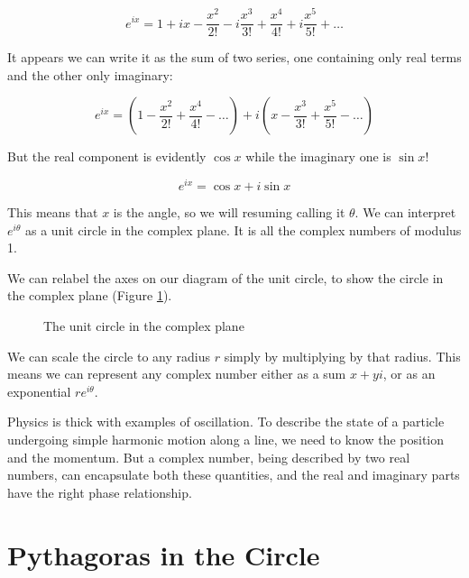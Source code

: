 $$
e^{ix} = 1 + ix - \frac{x^2}{2!} - i\frac{x^3}{3!} + \frac{x^4}{4!} + i\frac{x^5}{5!} + \ldots
$$

It appears we can write it as the sum of two series, one containing only real terms and the other only imaginary:

$$
e^{ix} = (1 - \frac{x^2}{2!} + \frac{x^4}{4!} - \ldots) + i(x - \frac{x^3}{3!} + \frac{x^5}{5!} - \ldots)
$$

But the real component is evidently $\cos x$ while the imaginary one is $\sin x$!

$$
e^{ix} = \cos x + i\sin x
$$

This means that $x$ is the angle, so we will resuming calling it $\theta$. We can interpret $e^{i\theta}$ as a unit circle in the complex plane. It is all the complex numbers of modulus 1.

We can relabel the axes on our diagram of the unit circle, to show the circle in the complex plane (Figure \ref{fig:unit-circle-complex}).

\begin{figure}[h]
    \centering
    \caption{The unit circle in the complex plane} \label{fig:unit-circle-complex}
\end{figure}

We can scale the circle to any radius $r$ simply by multiplying by that radius. This means we can represent any complex number either as a sum $x + yi$, or as an exponential $re^{i\theta}$.

Physics is thick with examples of oscillation. To describe the state of a particle undergoing simple harmonic motion along a line, we need to know the position and the momentum. But a complex number, being described by two real numbers, can encapsulate both these quantities, and the real and imaginary parts have the right phase relationship.

\section{Pythagoras in the Circle}

